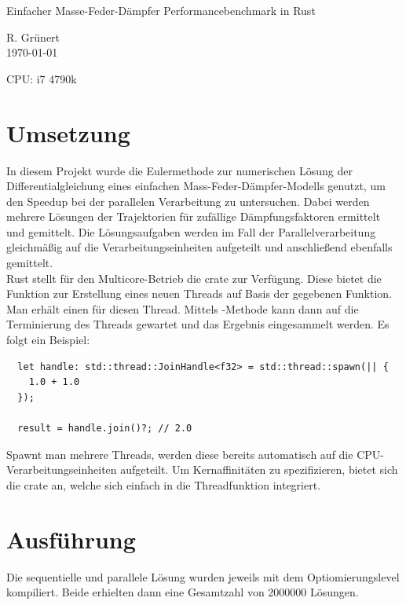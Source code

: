 \documentclass[10pt, a4paper]{article}
\begin{document}
%

\begin{center}
  \Large{Einfacher Masse-Feder-Dämpfer Performancebenchmark in Rust}
\end{center}

\begin{flushright}
  R. Grünert\\
  \today
\end{flushright}

\begin{flushleft}
  CPU: i7 4790k
\end{flushleft}

\section{Umsetzung}
In diesem Projekt wurde die Eulermethode zur numerischen Lösung der Differentialgleichung eines einfachen Mass-Feder-Dämpfer-Modells genutzt, um den Speedup bei der parallelen Verarbeitung zu untersuchen. Dabei werden mehrere Lösungen der Trajektorien für zufällige Dämpfungsfaktoren ermittelt und gemittelt. Die Lösungsaufgaben werden im Fall der Parallelverarbeitung gleichmäßig auf die Verarbeitungseinheiten aufgeteilt und anschließend ebenfalls gemittelt.\\

Rust stellt für den Multicore-Betrieb die crate  zur Verfügung. Diese bietet die Funktion  zur Erstellung eines neuen Threads auf Basis der gegebenen Funktion. Man erhält einen  für diesen Thread. Mittels -Methode kann dann auf die Terminierung des Threads gewartet und das Ergebnis \glqq{}eingesammelt\grqq{} werden. Es folgt ein Beispiel:

\begin{verbatim}
  let handle: std::thread::JoinHandle<f32> = std::thread::spawn(|| {
    1.0 + 1.0
  });

  result = handle.join()?; // 2.0
\end{verbatim}
\medskip

Spawnt man mehrere Threads, werden diese bereits automatisch auf die CPU-Verarbeitungseinheiten aufgeteilt. Um Kernaffinitäten zu spezifizieren, bietet sich die  crate an, welche sich einfach in die Threadfunktion integriert.

\section{Ausführung}
Die sequentielle und parallele Lösung wurden jeweils mit dem Optiomierungslevel  kompiliert. Beide erhielten dann eine Gesamtzahl von 2000000 Lösungen.\\
\end{document}
